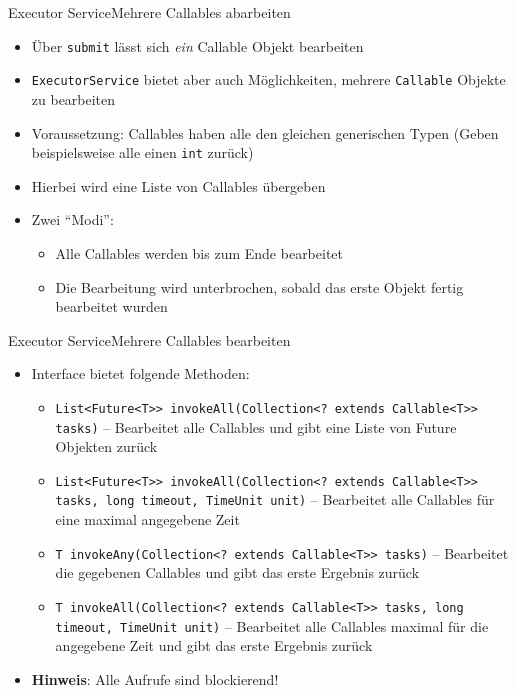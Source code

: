 \begin{frame}{Executor Service}{Mehrere Callables abarbeiten}
    \begin{itemize}
        \item Über \texttt{submit} lässt sich \textit{ein} Callable Objekt bearbeiten
        \item \texttt{ExecutorService} bietet aber auch Möglichkeiten, mehrere \texttt{Callable} Objekte zu bearbeiten
        \item Voraussetzung: Callables haben alle den gleichen generischen Typen (Geben beispielsweise alle einen \texttt{int} zurück)
        \item Hierbei wird eine Liste von Callables übergeben
        \item Zwei "`Modi"':
        \begin{itemize}
            \item Alle Callables werden bis zum Ende bearbeitet
            \item Die Bearbeitung wird unterbrochen, sobald das erste Objekt fertig bearbeitet wurden
        \end{itemize}
    \end{itemize}
\end{frame}

\begin{frame}{Executor Service}{Mehrere Callables bearbeiten}
    \begin{itemize}
        \item Interface bietet folgende Methoden:
        \begin{itemize}
            \item \texttt{List<Future<T>> invokeAll(Collection<? extends Callable<T>> tasks)} -- Bearbeitet alle Callables und gibt eine Liste von Future Objekten zurück
            \item \texttt{List<Future<T>> invokeAll(Collection<? extends Callable<T>> tasks, long timeout, TimeUnit unit)} -- Bearbeitet alle Callables für eine maximal angegebene Zeit
            \item \texttt{T invokeAny(Collection<? extends Callable<T>> tasks)} -- Bearbeitet die gegebenen Callables und gibt das erste Ergebnis zurück
            \item \texttt{T invokeAll(Collection<? extends Callable<T>> tasks, long timeout, TimeUnit unit)} -- Bearbeitet alle Callables maximal für die angegebene Zeit und gibt das erste Ergebnis zurück
        \end{itemize}
        \item \textbf{Hinweis}: Alle Aufrufe sind blockierend!
    \end{itemize}
\end{frame}

